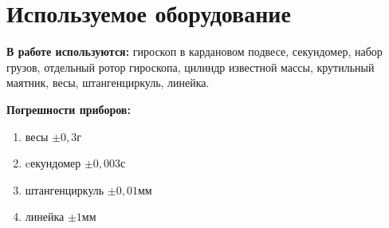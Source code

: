   \section{Используемое оборудование}
    \textbf{В работе используются:} гироскоп в кардановом подвесе, секундомер, набор грузов, отдельный ротор гироскопа, цилиндр известной массы,
    крутильный маятник, весы, штангенциркуль, линейка.

    \textbf{Погрешности приборов:}  \begin{enumerate}
        \item весы $\pm 0,3 \text{г}$
        \item cекундомер $\pm 0,003 \text{с}$
        \item штангенциркуль $\pm 0,01 \text{мм}$
        \item линейка $\pm 1 \text{мм}$
    \end{enumerate}
